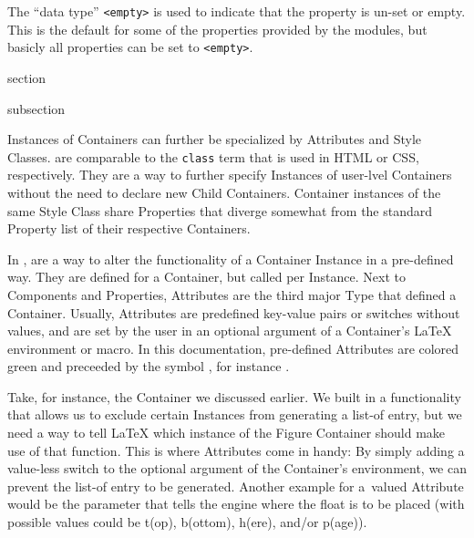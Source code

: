 The “data type” \texttt{<empty>} is used to indicate that the property
is un-set or empty. This is the default for some of the properties
provided by the {\CoCoTeX} modules, but basicly all properties can
be set to \texttt{<empty>}.


\begin{Heading}{section}
\end{Heading}


\begin{Heading}{subsection}
\end{Heading}


Instances of Containers can further be specialized by Attributes and
Style Classes.  are comparable to the
\texttt{class} term that is used in HTML or CSS, respectively.  They
are a way to further specify Instances of user-lvel Containers without
the need to declare new Child Containers. Container instances of the
same Style Class share Properties that diverge somewhat from the
standard Property list of their respective Containers.

In \CoCoTeX,  are a way to alter the
functionality of a Container Instance in a pre-defined way. They are
defined for a Container, but called per Instance. Next to Components
and Properties, Attributes are the third major Type that defined a
Container. Usually, Attributes are predefined key-value pairs or
switches without values, and are set by the user in an optional
argument of a Container's {\LaTeX} environment or macro. In this
documentation, pre-defined Attributes are colored green and preceeded
by the symbol \AttrSymbol, for instance .

Take, for instance, the  Container we
discussed earlier. We built in a functionality that allows us to
exclude certain Instances from generating a list-of entry, but we need
a way to tell LaTeX which instance of the Figure Container should make
use of that function. This is where Attributes come in handy: By
simply adding a value-less switch  to the optional
argument of the  Container's environment, we
can prevent the list-of entry to be generated. Another example for
a~valued Attribute would be the  parameter that
tells the engine where the float is to be placed (with possible values
could be t(op), b(ottom), h(ere), and/or p(age)).


